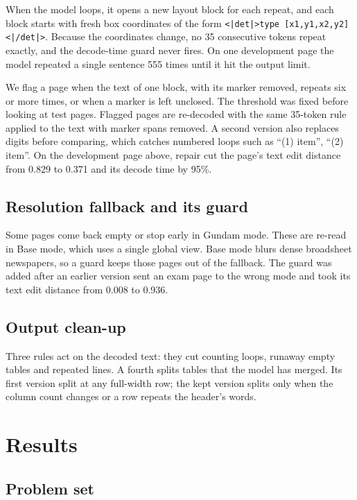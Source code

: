 \documentclass[journal]{IEEEtran}
\begin{document}
When the model loops, it opens a new layout block for each repeat, and each
block starts with fresh box coordinates of the form
\texttt{<|det|>type [x1,y1,x2,y2]<|/det|>}. Because the coordinates change, no 35
consecutive tokens repeat exactly, and the decode-time guard never fires. On one
development page the model repeated a single sentence 555 times until it hit the
output limit.

We flag a page when the text of one block, with its marker removed, repeats six
or more times, or when a marker is left unclosed. The threshold was fixed before
looking at test pages. Flagged pages are re-decoded with the same 35-token rule
applied to the text with marker spans removed. A second version also replaces
digits before comparing, which catches numbered loops such as ``(1) item'',
``(2) item''. On the development page above, repair cut the page's text edit
distance from 0.829 to 0.371 and its decode time by 95\%.

\subsection{Resolution fallback and its guard}

Some pages come back empty or stop early in Gundam mode. These are re-read in
Base mode, which uses a single global view. Base mode blurs dense broadsheet
newspapers, so a guard keeps those pages out of the fallback. The guard was
added after an earlier version sent an exam page to the wrong mode and took its
text edit distance from 0.008 to 0.936.

\subsection{Output clean-up}

Three rules act on the decoded text: they cut counting loops, runaway empty
tables and repeated lines. A fourth splits tables that the model has merged. Its
first version split at any full-width row; the kept version splits only when the
column count changes or a row repeats the header's words.

\section{Results}

\subsection{Problem set}
\end{document}
